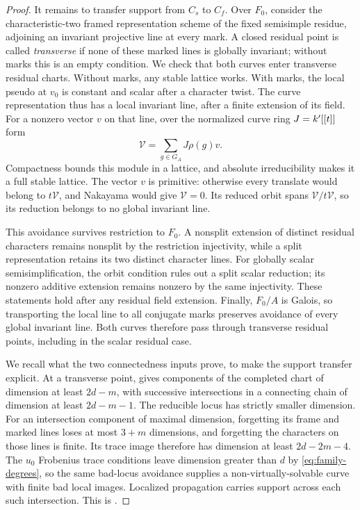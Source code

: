 \begin{proof}
It remains to transfer support from $C_s$ to $C_f$.  Over $F_0$,
consider the characteristic-two framed representation scheme of
the fixed semisimple residue, adjoining an invariant projective
line at every mark.  A closed residual point is called
\emph{transverse} if none of these marked lines is globally
invariant; without marks this is an empty condition.
We check that both curves enter transverse residual charts.
Without marks, any stable lattice works.  With marks, the local
pseudo at $v_0$ is constant and scalar after a character twist.
The curve representation thus has a local invariant line, after a
finite extension of its field.  For a nonzero vector $v$ on that
line, over the normalized curve ring $J=k'[[t]]$ form
\[
 \mathcal V=\sum_{g\in G_A}J\rho(g)v.
\]
Compactness bounds this module in a lattice, and absolute
irreducibility makes it a full stable lattice.  The vector $v$ is
primitive: otherwise every translate would belong to
$t\mathcal V$, and Nakayama would give $\mathcal V=0$.
Its reduced orbit spans $\mathcal V/t\mathcal V$, so its reduction
belongs to no global invariant line.

This avoidance survives restriction to $F_0$.  A nonsplit extension
of distinct residual characters remains nonsplit by the restriction
injectivity, while a split representation retains its two distinct
character lines.  For globally scalar semisimplification, the orbit
condition rules out a split scalar reduction; its nonzero additive
extension remains nonzero by the same injectivity.  These statements
hold after any residual field extension.  Finally, $F_0/A$ is
Galois, so transporting the local line to all conjugate marks
preserves avoidance of every global invariant line.  Both curves
therefore pass through transverse residual points, including in
the scalar residual case.

We recall what the two connectedness inputs prove, to make the
support transfer explicit.  At a transverse point,
\cite[Lemma~7.3]{FM2} gives components of the completed chart of
dimension at least $2d-m$, with successive intersections in a
connecting chain of dimension at least $2d-m-1$.  The reducible
locus has strictly smaller dimension.  For an intersection
component of maximal dimension, forgetting its frame and marked
lines loses at most $3+m$ dimensions, and forgetting the characters
on those lines is finite.  Its trace image therefore has dimension
at least $2d-2m-4$.  The $u_0$ Frobenius trace conditions leave
dimension greater than $d$ by \eqref{eq:family-degrees}, so the same
bad-locus avoidance supplies a non-virtually-solvable curve with
finite bad local images.  Localized propagation carries support
across each such intersection.  This is
\cite[Lemma~7.4]{FM2}.


\end{proof}
